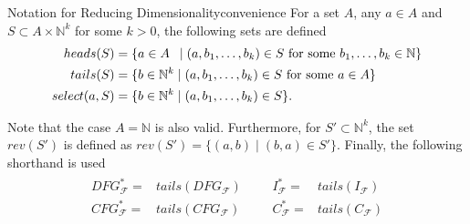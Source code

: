 \begin{definition}{Notation for Reducing Dimensionality}{convenience}
    For a set $A$, any $a\in A$ and $S\subset A\times\mathbb N^k$ for some $k>0$, the
    following sets are defined
    \begin{align*}
        heads(S)={}&\{a\in A\hspace{1.8mm}\mid(a,b_1,\dots,b_k)\in S\text{ for some }b_1,\dots,b_k\in\mathbb N\}\\
        tails(S)={}&\{b\in\mathbb N^k\mid(a,b_1,\dots,b_k)\in S\text{ for some }a\in A\}\\
        select(a,S)={}&\{b\in\mathbb N^k\mid(a,b_1,\dots,b_k)\in S\}.
    \end{align*}

    Note that the case $A=\mathbb N$ is also valid.
    Furthermore, for $S'\subset\mathbb N^k$, the set $rev(S')$ is defined as
    $rev(S')=\{(a,b)\mid(b,a)\in S'\}$.
    Finally, the following shorthand is used
    \begin{align*}
        \begin{aligned}
        DFG_\mathcal F^*={}&tails(DFG_\mathcal F)\\
        CFG_\mathcal F^*={}&tails(CFG_\mathcal F)
        \end{aligned}&&
        \begin{aligned}
        I_\mathcal F^*={}&tails(I_\mathcal F)\\
        C_\mathcal F^*={}&tails(C_\mathcal F)
        \end{aligned}
    \end{align*}
\end{definition}